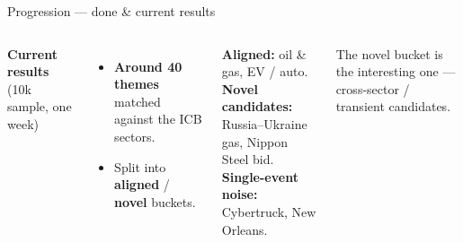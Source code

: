 \documentclass[10pt,aspectratio=169]{beamer}
\begin{document}
\begin{frame}{Progression --- done \& current results}
\begin{columns}[T,onlytextwidth]
      \textbf{Current results} \textcolor{black!55}{\scriptsize (10k sample, one week)}
      \begin{itemize}\setlength\itemsep{0.05cm}
        \item \textbf{Around 40 themes} matched against the ICB sectors.
        \item Split into \textbf{aligned} / \textbf{novel} buckets.
      \end{itemize}
      \vspace{0.10cm}
      \begin{tcolorbox}[colback=black!3, colframe=black!20,
                        boxrule=0.4pt, arc=2pt, left=6pt, right=6pt, top=3pt, bottom=3pt]
        \scriptsize
        \textcolor{good}{\textbf{Aligned:}} oil \& gas, EV / auto.\\[0.10cm]
        \textcolor{corporange}{\textbf{Novel candidates:}}
        Russia--Ukraine gas, Nippon Steel bid.\\[0.10cm]
        \textcolor{bad}{\textbf{Single-event noise:}}
        Cybertruck, New Orleans.
      \end{tcolorbox}
      \vspace{0.05cm}
      \textcolor{black!55}{\scriptsize The novel bucket is the interesting one ---
      cross-sector / transient candidates.}
  \end{columns}

\end{frame}
\end{document}
